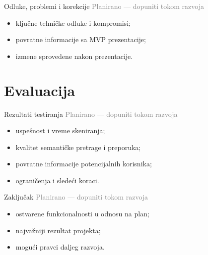 \documentclass[aspectratio=169,11pt]{beamer}
\newcommand{\planned}{\textcolor{gray}{\footnotesize Planirano --- dopuniti tokom razvoja}}
\begin{document}
\begin{frame}{Odluke, problemi i korekcije}
  \planned
  \begin{itemize}
    \item ključne tehničke odluke i kompromisi;
    \item povratne informacije sa MVP prezentacije;
    \item izmene sprovedene nakon prezentacije.
  \end{itemize}
\end{frame}

\section{Evaluacija}

\begin{frame}{Rezultati testiranja}
  \planned
  \begin{itemize}
    \item uspešnost i vreme skeniranja;
    \item kvalitet semantičke pretrage i preporuka;
    \item povratne informacije potencijalnih korisnika;
    \item ograničenja i sledeći koraci.
  \end{itemize}
\end{frame}

\begin{frame}{Zaključak}
  \planned
  \begin{itemize}
    \item ostvarene funkcionalnosti u odnosu na plan;
    \item najvažniji rezultat projekta;
    \item mogući pravci daljeg razvoja.
  \end{itemize}
\end{frame}
\end{document}
